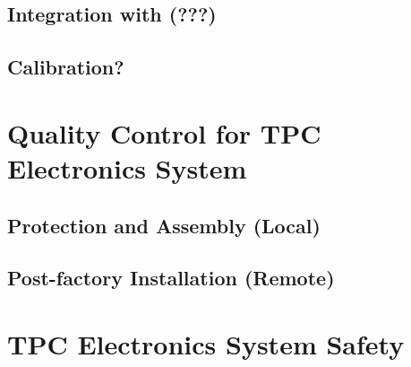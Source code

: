 \subsection{Integration with (???)}
\label{sec:fdsp-tpc-elec-install-integ}


\subsection{Calibration?}
\label{sec:fdsp-tpc-elec-install-calib}



\section{Quality Control for TPC Electronics System}
\label{sec:fdsp-tpc-elec-qc}

\subsection{Protection and Assembly (Local)}
\label{sec:fdsp-tpc-elec-qc-local}


\subsection{Post-factory Installation (Remote)}
\label{sec:fdsp-tpc-elec-qc-remote}





\section{TPC Electronics System Safety}
\label{sec:fdsp-tpc-elec-safety}






